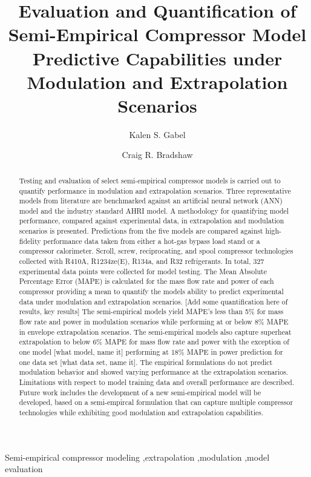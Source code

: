\documentclass[preprint,11pt,authoryear]{elsarticle}
\begin{document}

\begin{frontmatter}

\title{Evaluation and Quantification of Semi-Empirical Compressor Model Predictive Capabilities under Modulation and Extrapolation Scenarios}

\author[1]{Kalen S. Gabel
}
\author[1]{Craig R. Bradshaw}
\address[1]{Center for Integrated Building Systems, Oklahoma State University, Stillwater, OK 74078}
\begin{abstract}

Testing and evaluation of select semi-empirical compressor models is carried out to quantify performance in modulation and extrapolation scenarios. Three representative models from literature are benchmarked against an artificial neural network (ANN) model and the industry standard AHRI model. A methodology for quantifying model performance, compared against experimental data, in extrapolation and modulation scenarios is presented. Predictions from the five models are compared against high-fidelity performance data taken from either a hot-gas bypass load stand or a compressor calorimeter. Scroll, screw, reciprocating, and spool compressor technologies collected with R410A, R1234ze(E), R134a, and R32 refrigerants. In total, 327 experimental data points were collected for model testing. The Mean Absolute Percentage Error (MAPE) is calculated for the mass flow rate and power of each compressor providing a mean to quantify the models ability to predict experimental data under modulation and extrapolation scenarios. [Add some quantification here of results, key results] The semi-empirical models yield MAPE’s less than 5\% for mass flow rate and power in modulation scenarios while performing at or below 8\% MAPE in envelope extrapolation scenarios. The semi-empirical models also capture superheat extrapolation to below 6\% MAPE for mass flow rate and power with the exception of one model [what model, name it] performing at 18\% MAPE in power prediction for one data set [what data set, name it]. The empirical formulations do not predict modulation behavior and showed varying performance at the extrapolation scenarios. Limitations with respect to model training data and overall performance are described. Future work includes the development of a new semi-empirical model will be developed, based on a semi-empircal formulation that can capture multiple compressor technologies while exhibiting good modulation and extrapolation capabilities.

\end{abstract}

\begin{keyword}
Semi-empirical compressor modeling \sep extrapolation \sep modulation \sep model evaluation
\end{keyword}

\end{frontmatter}
\end{document}
